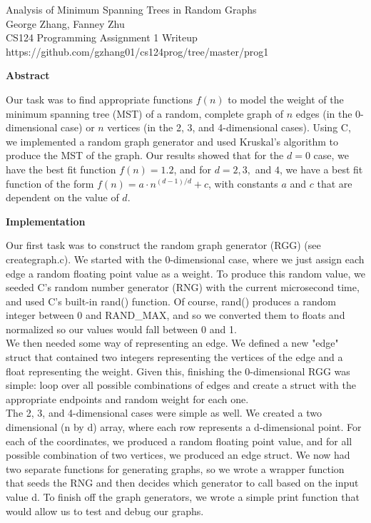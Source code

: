 \documentclass[12pt]{article}
\begin{document}
\begin{center}
Analysis of Minimum Spanning Trees in Random Graphs \\
George Zhang, Fanney Zhu \\
CS124 Programming Assignment 1 Writeup \\
https://github.com/gzhang01/cs124prog/tree/master/prog1 \\
\end{center}

\bigskip

\textbf{Abstract}

Our task was to find appropriate functions $f(n)$ to model the weight of the minimum spanning tree (MST) of a random, complete graph of $n$ edges (in the 0-dimensional case) or $n$ vertices (in the 2, 3, and 4-dimensional cases). Using C, we implemented a random graph generator and used Kruskal's algorithm to produce the MST of the graph. Our results showed that for the $d = 0$ case, we have the best fit function $f(n) = 1.2$, and for $d = 2, 3,$ and $4$, we have a best fit function of the form $f(n) = a\cdot n^{(d - 1)/d} + c$, with constants $a$ and $c$ that are dependent on the value of $d$.  \\

\bigskip

\textbf{Implementation}

Our first task was to construct the random graph generator (RGG) (see creategraph.c). We started with the 0-dimensional case, where we just assign each edge a random floating point value as a weight. To produce this random value, we seeded C's random number generator (RNG) with the current microsecond time, and used C's built-in rand() function. Of course, rand() produces a random integer between 0 and RAND\_MAX, and so we converted them to floats and normalized so our values would fall between 0 and 1. \\

We then needed some way of representing an edge. We defined a new "edge" struct that contained two integers representing the vertices of the edge and a float representing the weight. Given this, finishing the 0-dimensional RGG was simple: loop over all possible combinations of edges and create a struct with the appropriate endpoints and random weight for each one. \\

The 2, 3, and 4-dimensional cases were simple as well. We created a two dimensional (n by d) array, where each row represents a d-dimensional point. For each of the coordinates, we produced a random floating point value, and for all possible combination of two vertices, we produced an edge struct. We now had two separate functions for generating graphs, so we wrote a wrapper function that seeds the RNG and then decides which generator to call based on the input value d. To finish off the graph generators, we wrote a simple print function that would allow us to test and debug our graphs. \\
\end{document}
